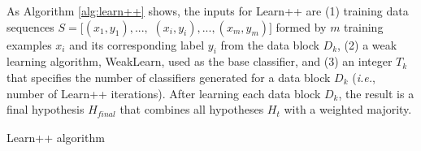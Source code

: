 As Algorithm \ref{alg:learn++} shows, the inputs for Learn++ are (1) training data sequences $S = [(x_1,y_1),...,$ $(x_i,y_i), ... , (x_m,y_m)]$ formed by $m$ training examples $x_i$ and its corresponding label $y_i$ from the data block $D_k$, (2) a weak learning algorithm, WeakLearn, used as the base classifier, and (3) an integer $T_k$ that specifies the number of classifiers generated for a data block $D_k$ (\emph{i.e.}, number of Learn++ iterations).
After learning each data block $D_k$, the result is a final hypothesis $H_\textit{final}$ that combines all hypotheses $H_t$ with a weighted majority.

\renewcommand{\thealgorithm}{\hspace{-3pt}-A I-\arabic{algorithm}}
\begin{algorithm}[]
  \captionsetup{list=no}
	\caption{Learn++ algorithm \cite{polikar01}}
	\label{alg:learn++}
\end{algorithm}
